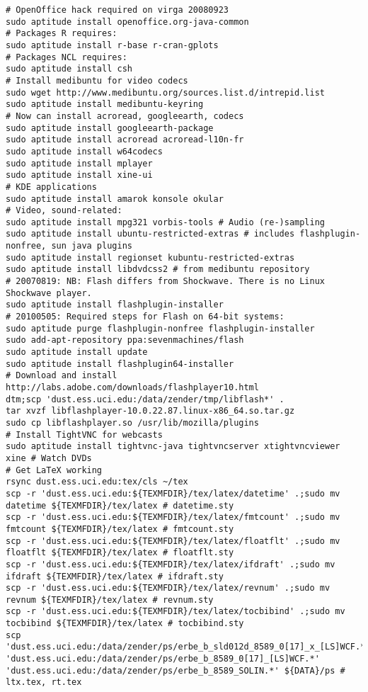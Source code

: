 \documentclass[12pt,twoside]{article}
\begin{document}
\begin{verbatim}
# OpenOffice hack required on virga 20080923
sudo aptitude install openoffice.org-java-common
# Packages R requires:
sudo aptitude install r-base r-cran-gplots
# Packages NCL requires:
sudo aptitude install csh
# Install medibuntu for video codecs
sudo wget http://www.medibuntu.org/sources.list.d/intrepid.list
sudo aptitude install medibuntu-keyring
# Now can install acroread, googleearth, codecs
sudo aptitude install googleearth-package
sudo aptitude install acroread acroread-l10n-fr
sudo aptitude install w64codecs
sudo aptitude install mplayer
sudo aptitude install xine-ui
# KDE applications
sudo aptitude install amarok konsole okular
# Video, sound-related: 
sudo aptitude install mpg321 vorbis-tools # Audio (re-)sampling
sudo aptitude install ubuntu-restricted-extras # includes flashplugin-nonfree, sun java plugins
sudo aptitude install regionset kubuntu-restricted-extras
sudo aptitude install libdvdcss2 # from medibuntu repository
# 20070819: NB: Flash differs from Shockwave. There is no Linux Shockwave player.
sudo aptitude install flashplugin-installer
# 20100505: Required steps for Flash on 64-bit systems:
sudo aptitude purge flashplugin-nonfree flashplugin-installer
sudo add-apt-repository ppa:sevenmachines/flash
sudo aptitude install update
sudo aptitude install flashplugin64-installer
# Download and install http://labs.adobe.com/downloads/flashplayer10.html
dtm;scp 'dust.ess.uci.edu:/data/zender/tmp/libflash*' .
tar xvzf libflashplayer-10.0.22.87.linux-x86_64.so.tar.gz
sudo cp libflashplayer.so /usr/lib/mozilla/plugins
# Install TightVNC for webcasts
sudo aptitude install tightvnc-java tightvncserver xtightvncviewer
xine # Watch DVDs
# Get LaTeX working
rsync dust.ess.uci.edu:tex/cls ~/tex
scp -r 'dust.ess.uci.edu:${TEXMFDIR}/tex/latex/datetime' .;sudo mv datetime ${TEXMFDIR}/tex/latex # datetime.sty
scp -r 'dust.ess.uci.edu:${TEXMFDIR}/tex/latex/fmtcount' .;sudo mv fmtcount ${TEXMFDIR}/tex/latex # fmtcount.sty
scp -r 'dust.ess.uci.edu:${TEXMFDIR}/tex/latex/floatflt' .;sudo mv floatflt ${TEXMFDIR}/tex/latex # floatflt.sty
scp -r 'dust.ess.uci.edu:${TEXMFDIR}/tex/latex/ifdraft' .;sudo mv ifdraft ${TEXMFDIR}/tex/latex # ifdraft.sty
scp -r 'dust.ess.uci.edu:${TEXMFDIR}/tex/latex/revnum' .;sudo mv revnum ${TEXMFDIR}/tex/latex # revnum.sty
scp -r 'dust.ess.uci.edu:${TEXMFDIR}/tex/latex/tocbibind' .;sudo mv tocbibind ${TEXMFDIR}/tex/latex # tocbibind.sty
scp 'dust.ess.uci.edu:/data/zender/ps/erbe_b_sld012d_8589_0[17]_x_[LS]WCF.*' 'dust.ess.uci.edu:/data/zender/ps/erbe_b_8589_0[17]_[LS]WCF.*' 'dust.ess.uci.edu:/data/zender/ps/erbe_b_8589_SOLIN.*' ${DATA}/ps # ltx.tex, rt.tex

\end{verbatim}
\end{document}
